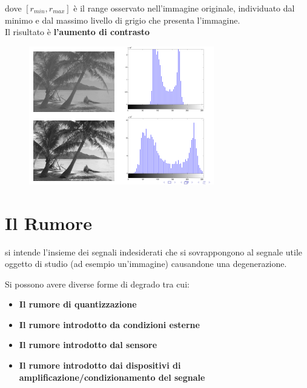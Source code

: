 dove $[r_{min}, r_{max} ]$ è il range osservato nell'immagine originale,
individuato dal minimo e dal massimo livello di grigio che presenta l'immagine.
\\Il risultato è \textbf{l'aumento di contrasto}

\begin{figure}[H]
    \centering
    \includegraphics[width=\linewidth, keepaspectratio]{capitoli/immagini/imgs/stretch-isto.png}
\end{figure}

\section{Il Rumore}

\begin{definition}
    si intende l'insieme dei segnali indesiderati che si sovrappongono al segnale utile oggetto di studio (ad esempio un'immagine) causandone una degenerazione.
\end{definition}

Si possono avere diverse forme di degrado tra cui:
\begin{itemize}
    \item \textbf{Il rumore di quantizzazione}
    \item \textbf{Il rumore introdotto da condizioni esterne}
    \item \textbf{Il rumore introdotto dal sensore}
    \item \textbf{Il rumore introdotto dai dispositivi di
              amplificazione/condizionamento del segnale}
\end{itemize}

